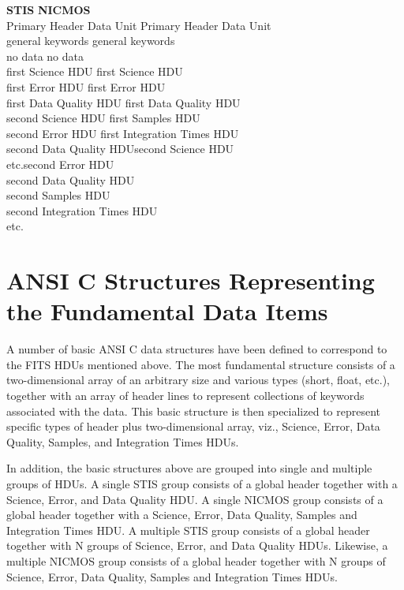\begin{tabbing}
\={\bf STIS} \hspace{2.6in} \={\bf NICMOS} \\
\> Primary Header Data Unit \> Primary Header Data Unit \\
\> \hspace{0.5in} general keywords \> \hspace{0.5in} general keywords \\
\> \hspace{0.5in} no data \> \hspace{0.5in} no data\\
\> first Science HDU \>first Science HDU\\
\>first Error HDU \>first Error HDU\\
\>first Data Quality HDU \>first Data Quality HDU\\
\>second Science HDU \>first Samples HDU\\
\>second Error HDU \>first Integration Times HDU\\
\>second Data Quality HDU\>second Science HDU\\
\>etc.\>second Error HDU\\
\>\>second Data Quality HDU\\
\>\>second Samples HDU\\
\>\>second Integration Times HDU\\
\>\>etc.
\end{tabbing}

\section{ANSI C Structures Representing the Fundamental Data Items}

A number of basic ANSI C data structures have been defined to correspond
to the FITS HDUs mentioned above.  The most fundamental structure
consists of a two-dimensional array of an arbitrary size and various
types (short, float, etc.), together with an array of header lines to
represent collections of keywords associated with the data.  This basic
structure is then specialized to represent specific types of header plus
two-dimensional array, viz., Science, Error, Data Quality, Samples, and
Integration Times HDUs. 

In addition, the basic structures above are grouped into single and
multiple groups of HDUs.  A single STIS group consists of a global
header together with a Science, Error, and Data Quality HDU.  A single
NICMOS group consists of a global header together with a Science, Error,
Data Quality, Samples and Integration Times HDU.  A multiple STIS group
consists of a global header together with N groups of Science, Error,
and Data Quality HDUs.  Likewise, a multiple NICMOS group consists of a
global header together with N groups of Science, Error, Data Quality,
Samples and Integration Times HDUs. 

